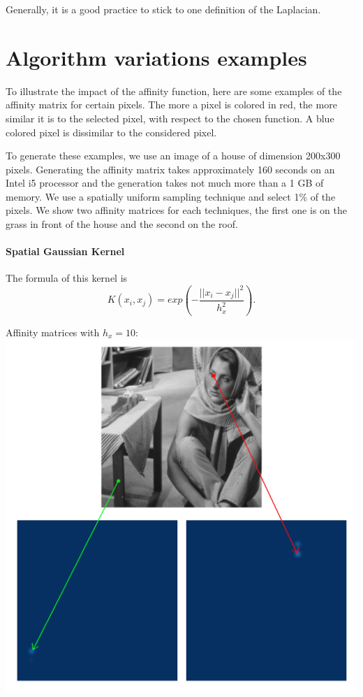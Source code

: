 Generally, it is a good practice to stick to one definition of the Laplacian.

\section{Algorithm variations examples}

To illustrate the impact of the affinity function, here are some examples of the affinity matrix for certain pixels.
The more a pixel is colored in red, the more similar it is to the selected pixel, with respect to the chosen function.
A blue colored pixel is dissimilar to the considered pixel.

To generate these examples, we use an image of a house of dimension 200x300 pixels. Generating the affinity matrix takes approximately 160 seconds on an Intel i5 processor and the generation takes not much more than a 1 GB of memory. We use a spatially uniform sampling technique and select 1\% of the pixels. We show two affinity matrices for each techniques, the first one is on the grass in front of the house and the second on the roof.


\paragraph{Spatial Gaussian Kernel}
The formula of this kernel is
\[K(x_i, x_j) = exp(-\frac{||x_i - x_j||^2}{h_x^2}).\]

Affinity matrices with \(h_x = 10\): \\
\includegraphics[width=\textwidth]{img/spatialAffinitySigma10.png}

